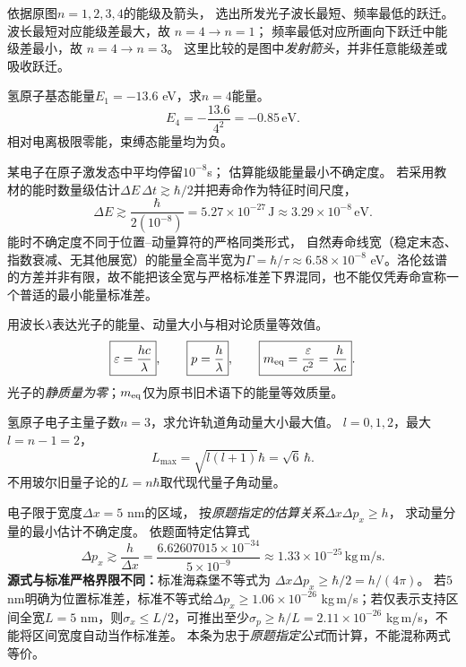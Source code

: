 \problemtext 依据原图$n=1,2,3,4$的能级及箭头，
选出所发光子波长最短、频率最低的跃迁。
\workings
波长最短对应能级差最大，故
$\boxed{n=4\to n=1}$；
频率最低对应所画向下跃迁中能级差最小，故
$\boxed{n=4\to n=3}$。
\crosscheck 这里比较的是图中\emph{发射箭头}，并非任意能级差或吸收跃迁。

\problemtext 氢原子基态能量$E_1=-13.6$ eV，求$n=4$能量。
\workings
\[
\boxed{E_4=-\frac{13.6}{4^2}=-0.85\,\mathrm{eV}}.
\]
\crosscheck 相对电离极限零能，束缚态能量均为负。

\problemtext 某电子在原子激发态中平均停留$10^{-8}$s；
估算能级能量最小不确定度。
\workings
若采用教材的能时数量级估计$\Delta E\,\Delta t\gtrsim\hbar/2$并把寿命作为特征时间尺度，
\[
\boxed{\Delta E\gtrsim\frac{\hbar}{2(10^{-8})}
=5.27\times10^{-27}\,\mathrm J
\approx3.29\times10^{-8}\,\mathrm{eV}}.
\]
\crosscheck 能时不确定度不同于位置--动量算符的严格同类形式，
自然寿命线宽（稳定末态、指数衰减、无其他展宽）的能量全高半宽为$\Gamma=\hbar/\tau\approx6.58\times10^{-8}$ eV。洛伦兹谱的方差并非有限，故不能把该全宽与严格标准差下界混同，也不能仅凭寿命宣称一个普适的最小能量标准差。

\problemtext 用波长$\lambda$表达光子的能量、动量大小与相对论质量等效值。
\workings
\[
\boxed{\varepsilon=\frac{hc}{\lambda}},\qquad
\boxed{p=\frac h\lambda},\qquad
\boxed{m_{\rm eq}=\frac{\varepsilon}{c^2}=\frac h{\lambda c}}.
\]
\crosscheck 光子的\emph{静质量为零}；$m_{\rm eq}$仅为原书旧术语下的能量等效质量。

\problemtext 氢原子电子主量子数$n=3$，求允许轨道角动量大小最大值。
\workings
$l=0,1,2$，最大$l=n-1=2$，
\[
\boxed{L_{\max}=\sqrt{l(l+1)}\hbar=\sqrt6\,\hbar}.
\]
\crosscheck 不用玻尔旧量子论的$L=n\hbar$取代现代量子角动量。

\problemtext 电子限于宽度$\Delta x=5$ nm的区域，
按\emph{原题指定的估算关系}$\Delta x\Delta p_x\ge h$，
求动量分量的最小估计不确定度。
\workings
依题面特定估算式
\[
\boxed{\Delta p_x\gtrsim\frac h{\Delta x}
=\frac{6.62607015\times10^{-34}}{5\times10^{-9}}
\approx1.33\times10^{-25}\,\mathrm{kg\,m/s}}.
\]
\crosscheck \textbf{源式与标准严格界限不同：}标准海森堡不等式为
$\Delta x\Delta p_x\ge\hbar/2=h/(4\pi)$。
若$5$ nm明确为位置标准差，标准不等式给$\Delta p_x\ge1.06\times10^{-26}$ kg\,m/s；若仅表示支持区间全宽$L=5$ nm，则$\sigma_x\le L/2$，可推出至少$\sigma_p\ge\hbar/L=2.11\times10^{-26}$ kg\,m/s，不能将区间宽度自动当作标准差。
本条为忠于\emph{原题指定公式}而计算，不能混称两式等价。

